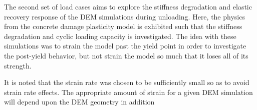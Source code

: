 The second set of load cases aims to explore the stiffness degradation and elastic recovery response of the DEM simulations during unloading. Here, the physics from the concrete damage plasticity model is exhibited such that the stiffness degradation and cyclic loading capacity is investigated. The idea with these simulations was to strain the model past the yield point in order to investigate the post-yield behavior,
but not strain the model so much that it loses all of its strength.

It is noted that the strain rate was chosen to be sufficiently small
so as to avoid strain rate effects. The appropriate amount of strain
for a given DEM simulation will depend upon the DEM geometry in addition
